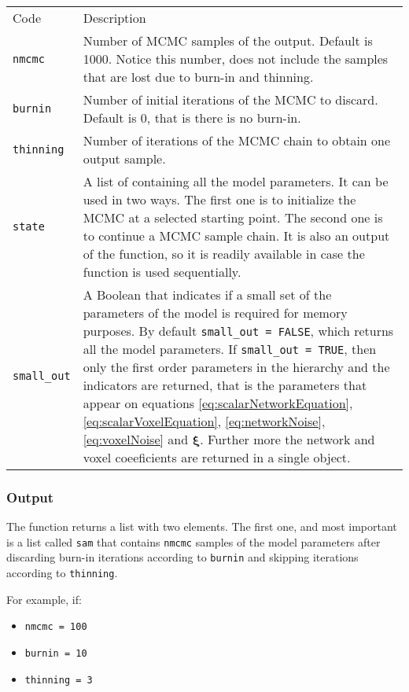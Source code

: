 \documentclass[
]{article}
\providecommand{\tightlist}{%
  \setlength{\itemsep}{0pt}\setlength{\parskip}{0pt}}
\begin{document}
\begin{longtable}[]{@{}
  >{\raggedleft\arraybackslash}p{}
  >{\raggedright\arraybackslash}p{}@{}}
\toprule\noalign{}
\endhead
\bottomrule\noalign{}
\endlastfoot
Code & Description \\
\texttt{nmcmc} & Number of MCMC samples of the output. Default is 1000. Notice this number, does
not include the samples that are lost due to burn-in and thinning. \\
\texttt{burnin} & Number of initial iterations of the MCMC to discard. Default is 0, that is there
is no burn-in. \\
\texttt{thinning} & Number of iterations of the MCMC chain to obtain one output sample. \\
\texttt{state} & A list of containing all the model parameters. It can be used in two ways. The first
one is to initialize the MCMC at a selected starting point. The second one is to
continue a MCMC sample chain. It is also an output of the function, so it is readily
available in case the function is used sequentially. \\
\texttt{small\_out} & A Boolean that indicates if a small set of the parameters of the model
is required for memory purposes. By default \texttt{small\_out\ =\ FALSE}, which returns all the
model parameters. If \texttt{small\_out\ =\ TRUE}, then only the first order parameters in the
hierarchy and the indicators are returned, that is the parameters that appear on
equations \eqref{eq:scalarNetworkEquation}, \eqref{eq:scalarVoxelEquation},
\eqref{eq:networkNoise}, \eqref{eq:voxelNoise} and \( {\boldsymbol \xi} \). Further more the network and
voxel coeeficients are returned in a single object. \\
\end{longtable}

\subsubsection{Output}\label{output}

The function returns a list with two elements. The first one, and most
important is a list called \texttt{sam} that contains \texttt{nmcmc} samples of the model
parameters after discarding burn-in iterations according to \texttt{burnin}
and skipping iterations according to \texttt{thinning}.

For example, if:

\begin{itemize}
\tightlist
\item
  \texttt{nmcmc\ =\ 100}
\item
  \texttt{burnin\ =\ 10}
\item
  \texttt{thinning\ =\ 3}
\end{itemize}
\end{document}
